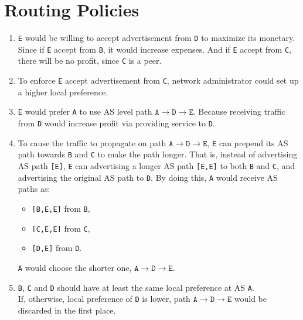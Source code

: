 \documentclass[12pt,titlepage,letterpaper]{article}
\begin{document}
\section{Routing Policies}
\begin{enumerate}[label=\bfseries\alph*)]
    \item \texttt{E} would be willing to accept advertisement from \texttt{D}
        to maximize its monetary. Since if \texttt{E} accept from \texttt{B},
        it would increase expenses. And if \texttt{E} accept from \texttt{C},
        there will be no profit, since \texttt{C} is a peer.
    \item To enforce \texttt{E} accept advertisement from \texttt{C}, network
        administrator could set up a higher local preference.
    \item \texttt{E} would prefer \texttt{A} to use AS level path
        $\mathtt{A}\rightarrow\mathtt{D}\rightarrow\mathtt{E}$. Because
        receiving traffic from \texttt{D} would increase profit via providing
        service to \texttt{D}.
    \item To cause the traffic to propagate on path 
        $\mathtt{A}\rightarrow\mathtt{D}\rightarrow\mathtt{E}$, \texttt{E} can
        prepend its AS path towards \texttt{B} and \texttt{C} to make the path
        longer. That is, instead of advertising AS path \texttt{[E]},
        \texttt{E} can advertising a longer AS path \texttt{[E,E]} to both
        \texttt{B} and \texttt{C}, and advertising the original AS path to
        \texttt{D}. By doing this, \texttt{A} would receive AS paths as:
        \begin{itemize}[label=-]
            \item \texttt{[B,E,E]} from \texttt{B},
            \item \texttt{[C,E,E]} from \texttt{C},
            \item \texttt{[D,E]} from \texttt{D}.
        \end{itemize}
        \texttt{A} would choose the shorter one,
        $\mathtt{A}\rightarrow\mathtt{D}\rightarrow\mathtt{E}$.
    \item \texttt{B}, \texttt{C} and \texttt{D} should have at least the same
        local preference at AS \texttt{A}.\\ If, otherwise, local preference of
        \texttt{D} is lower, path
        $\mathtt{A}\rightarrow\mathtt{D}\rightarrow\mathtt{E}$
        would be discarded in the first place.
\end{enumerate}
\end{document}
